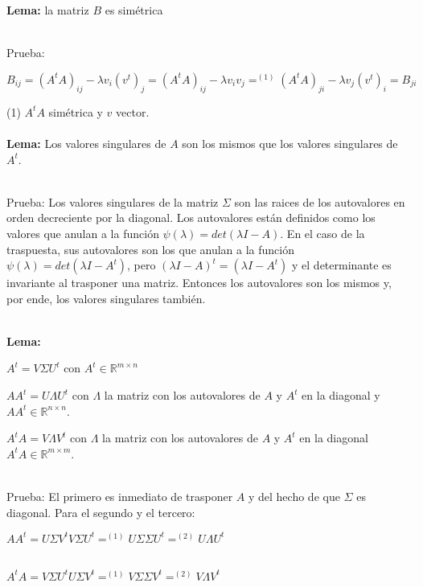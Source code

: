 \ \\

\ \\
\textbf{Lema:} la matriz $B$ es simétrica

\ \\
Prueba:

\begin{center}
  $B_{ij} = (A^t A)_{ij} - \lambda v_i (v^t)_j = (A^t A)_{ij} - \lambda v_i v_j =^{(1)} (A^t A)_{ji}
  - \lambda v_j (v^t)_i = B_{ji}$
\end{center}

(1) $A^t A$ simétrica y $v$ vector.
\ \\


\ \\
\textbf{Lema:} Los valores singulares de $A$ son los mismos que los valores singulares de $A^t$.

\ \\
Prueba: Los valores singulares de la matriz $\Sigma$ son las raices de los autovalores en orden
decreciente por la diagonal. Los autovalores están definidos como los valores que anulan a la
función
$\psi(\lambda) = det(\lambda I - A)$. En el caso de la traspuesta, sus autovalores son los que
anulan a la función $\psi(\lambda) = det(\lambda I - A^t)$, pero $(\lambda I - A)^t = (\lambda I -
A^t)$ y el determinante es invariante al trasponer una matriz. Entonces los autovalores son los
mismos y, por ende, los valores singulares también.


\ \\
\textbf{Lema:}
\begin{compactitem}
  \item $A^t = V \Sigma U^t$ con $A^t \in \mathbb{R}^{m \times n}$
  \item $A A^t = U \Lambda U^t$ con $\Lambda$ la matriz con los autovalores de $A$ y $A^t$ en
    la diagonal y $A A^t \in \mathbb{R}^{n \times n}$.
  \item $A^t A = V \Lambda V^t $ con $\Lambda$ la matriz con los autovalores de $A$ y $A^t$ en
    la diagonal $A^t A \in \mathbb{R}^{m \times m}$.
\end{compactitem}

\ \\
Prueba: El primero es inmediato de trasponer $A$ y del hecho de que $\Sigma$ es diagonal. Para el
segundo y el tercero:
\begin{center}
$A A^t = U \Sigma V^t V \Sigma U^t =^{(1)} U \Sigma \Sigma U^t =^{(2)} U \Lambda U^t$

\ \\
$A^t A = V \Sigma U^t U \Sigma V^t =^{(1)} V \Sigma \Sigma V^t =^{(2)} V \Lambda V^t$
\end{center}

